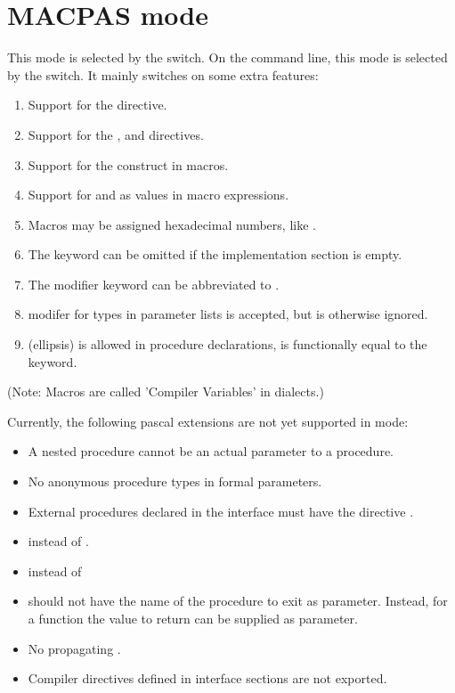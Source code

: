 \section{MACPAS mode}
This mode is selected by the  switch. On the
command line, this mode is selected by the  switch. It mainly
switches on some extra features:
\begin{enumerate}
\item Support for the  directive.
\item Support for the ,  and 
directives.
\item Support for the  construct in macros.
\item Support for  and  as values in macro expressions.
\item Macros may be assigned hexadecimal numbers, like .
\item The  keyword can be omitted if the implementation
section is empty.
\item The  modifier keyword can be abbreviated to .
\item {} modifer for types in parameter lists is accepted, but is
otherwise ignored.
\item {} (ellipsis) is allowed in procedure declarations, is
functionally equal to the  keyword.
\end{enumerate}
(Note: Macros are called 'Compiler Variables' in \macos dialects.)

Currently, the following \macos pascal extensions are not yet supported in
 mode:
\begin{itemize}
\item A nested procedure cannot be an actual parameter to a procedure. 
\item No anonymous procedure types in formal parameters. 
\item External procedures declared in the interface must have the directive . 
\item {} instead of .
\item {} instead of 
\item {} should not have the name of the procedure to exit as parameter.
Instead, for a function the value to return can be supplied as parameter. 
\item No propagating .
\item Compiler directives defined in interface sections are not exported.
\end{itemize}

